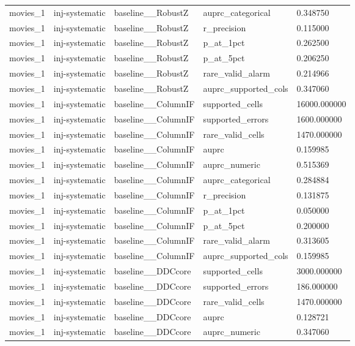 \begin{tabular}{lllll}
movies\_1 & inj-systematic & baseline\_\_RobustZ & auprc\_categorical & 0.348750 \\
movies\_1 & inj-systematic & baseline\_\_RobustZ & r\_precision & 0.115000 \\
movies\_1 & inj-systematic & baseline\_\_RobustZ & p\_at\_1pct & 0.262500 \\
movies\_1 & inj-systematic & baseline\_\_RobustZ & p\_at\_5pct & 0.206250 \\
movies\_1 & inj-systematic & baseline\_\_RobustZ & rare\_valid\_alarm & 0.214966 \\
movies\_1 & inj-systematic & baseline\_\_RobustZ & auprc\_supported\_cols & 0.347060 \\
movies\_1 & inj-systematic & baseline\_\_ColumnIF & supported\_cells & 16000.000000 \\
movies\_1 & inj-systematic & baseline\_\_ColumnIF & supported\_errors & 1600.000000 \\
movies\_1 & inj-systematic & baseline\_\_ColumnIF & rare\_valid\_cells & 1470.000000 \\
movies\_1 & inj-systematic & baseline\_\_ColumnIF & auprc & 0.159985 \\
movies\_1 & inj-systematic & baseline\_\_ColumnIF & auprc\_numeric & 0.515369 \\
movies\_1 & inj-systematic & baseline\_\_ColumnIF & auprc\_categorical & 0.284884 \\
movies\_1 & inj-systematic & baseline\_\_ColumnIF & r\_precision & 0.131875 \\
movies\_1 & inj-systematic & baseline\_\_ColumnIF & p\_at\_1pct & 0.050000 \\
movies\_1 & inj-systematic & baseline\_\_ColumnIF & p\_at\_5pct & 0.200000 \\
movies\_1 & inj-systematic & baseline\_\_ColumnIF & rare\_valid\_alarm & 0.313605 \\
movies\_1 & inj-systematic & baseline\_\_ColumnIF & auprc\_supported\_cols & 0.159985 \\
movies\_1 & inj-systematic & baseline\_\_DDCcore & supported\_cells & 3000.000000 \\
movies\_1 & inj-systematic & baseline\_\_DDCcore & supported\_errors & 186.000000 \\
movies\_1 & inj-systematic & baseline\_\_DDCcore & rare\_valid\_cells & 1470.000000 \\
movies\_1 & inj-systematic & baseline\_\_DDCcore & auprc & 0.128721 \\
movies\_1 & inj-systematic & baseline\_\_DDCcore & auprc\_numeric & 0.347060 \\

\end{tabular}
